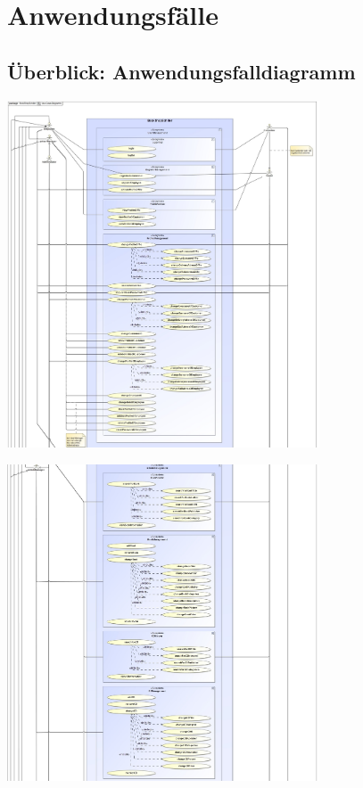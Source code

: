\documentclass[a4paper]{article}
\begin{document}
\section{Anwendungsfälle}

\subsection{Überblick: Anwendungsfalldiagramm}

\includegraphics[width=350px]{use-case-diagramm-part1.jpg}

\includegraphics[width=350px]{use-case-diagramm-part2.jpg}
\end{document}
